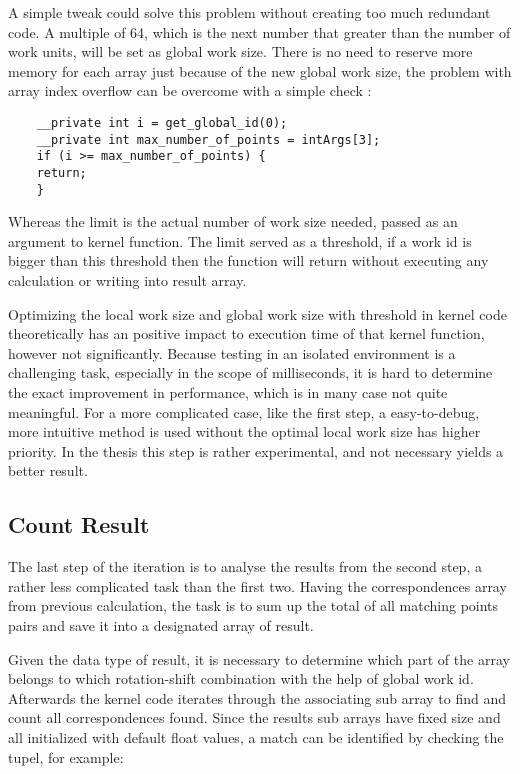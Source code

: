  A simple tweak could solve this problem without creating too much redundant code. A multiple of 64, which is the next number that greater than the number of work units, will be set as global work size. There is no need to reserve more memory for each array just because of the new global work size, the problem with array index overflow can be overcome with a simple check :

\begin{lstlisting}
	__private int i = get_global_id(0);
	__private int max_number_of_points = intArgs[3];
	if (i >= max_number_of_points) {
    return;
	}
\end{lstlisting}

Whereas the limit is the actual number of work size needed, passed as an argument to kernel function. The limit served as a threshold, if a work id is bigger than this threshold then the function will return without executing any calculation or writing into result array.

Optimizing the local work size and global work size with threshold in kernel code theoretically has an positive impact to execution time of that kernel function, however not significantly. Because testing in an isolated environment is a challenging task, especially in the scope of milliseconds, it is hard to determine the exact improvement in performance, which is in many case not quite meaningful. For a more complicated  case, like the first step, a easy-to-debug, more intuitive method is used without the optimal local work size has higher priority. In the thesis this step is rather experimental, and not necessary yields a better result. 

\subsection{Count Result}
The last step of the iteration is to analyse the results from the second step, a rather less complicated task than the first two. Having the correspondences array from previous calculation, the task is to sum up the total of all matching points pairs and save it into a designated array of result. 

Given the data type of result, it is necessary to determine which part of the array belongs to which rotation-shift combination with the help of global work id. Afterwards the kernel code iterates through the associating sub array to find and count all correspondences found. Since the results sub arrays have fixed size and all initialized with default float values, a match can be identified by checking the tupel, for example:


